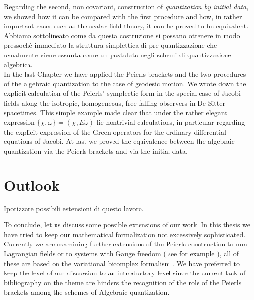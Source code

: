 \documentclass[Main]{subfiles}
\begin{document}
Regarding the second, non covariant, construction of \emph{quantization by initial data}, we showed how it can be compared with the first procedure and how, in rather important cases such as the scalar field theory, it can be proved to be equivalent.
\ifToninus
Abbiamo sottolineato come da questa costruzione si possano ottenere in modo pressochè immediato la struttura simplettica di pre-quantizzazione che usualmente viene assunta come un postulato negli schemi di quantizzazione algebrica.
\fi
\\
In the last Chapter we have applied the Peierls brackets and the two procedures of the algebraic quantization to the case of geodesic motion.
We wrote down the explicit calculation of the Peierls' symplectic form in the special case of Jacobi fields along the isotropic, homogeneous, free-falling  observers in De Sitter spacetimes. This simple example made clear that under the rather elegant expression $\{\chi, \omega\} \coloneqq ( \chi, E \omega)$ lie nontrivial calculations, in particular regarding the explicit expression of the Green operators for the ordinary differential equations of Jacobi.
At last we proved the equivalence between the algebraic quantization via the Peierls brackets and via the initial data.

\vspace{2mm}%

\ifToninus
\section{Outlook}
Ipotizzare possibili estensioni di questo lavoro.

\fi
To conclude, let us discuss  some possible extensions of our work.
	In this thesis we have tried to keep our mathematical formalization not excessively sophisticated. 
	Currently we are examining further extensions of the Peierls construction to non Lagrangian fields or to systems with Gauge freedom ( see for example \cite{Khavkine2014} ), all of these are based on the variational bicomplex formalism \cite{G.Sardanashvily2013}.
	We have preferred to keep the level of our discussion to an introductory level since the current lack of bibliography on the theme are hinders the recognition of the role of the Peierls brackets among the schemes of Algebraic quantization.
	
\end{document}
